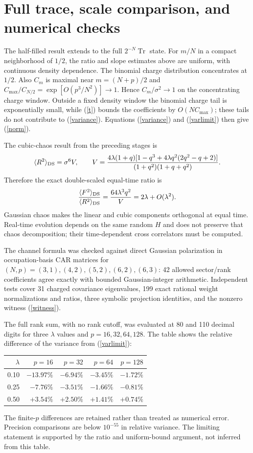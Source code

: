 \documentclass[11pt,a4paper]{article}
\newcommand{\av}[1]{\langle #1\rangle}
\begin{document}
\newpage
\section{Full trace, scale comparison, and numerical checks}
The half-filled result extends to the full
$2^{-N}\operatorname{Tr}$ state. For $m/N$ in a compact
neighborhood of $1/2$, the ratio and slope estimates above are
uniform, with continuous density dependence.
The binomial charge distribution concentrates at $1/2$.
Also $C_m$ is maximal near $m=(N+p)/2$ and
$C_{\max}/C_{N/2}=\exp[O(p^3/N^2)]\to1$.
Hence $C_m/\sigma^2\to1$ on the concentrating charge window.
Outside a fixed density window the binomial charge tail is
exponentially small, while (\ref{t}) bounds the coefficients
by $O(N C_{\max})$; these tails do not contribute to
(\ref{variance}). Equations (\ref{variance}) and (\ref{varlimit})
then give (\ref{norm}).

The cubic-chaos result from the preceding stages is
\[
 \av{R^2}_{\rm DS}=\sigma^6V,\qquad
 V=\frac{4\lambda(1+q)[1-q^3+4\lambda q^2(2q^2-q+2)]}
 {(1+q^2)(1+q+q^2)}.
\]
Therefore the exact double-scaled equal-time ratio is
\begin{equation}
 \frac{\av{F^2}_{\rm DS}}{\av{R^2}_{\rm DS}}
 =\frac{64\lambda^3q^2}{V}=2\lambda+O(\lambda^2).
\end{equation}
Gaussian chaos makes the linear and cubic components orthogonal
at equal time. Real-time evolution depends on the same random
$H$ and does not preserve that chaos decomposition; their
time-dependent cross correlators must be computed.

The channel formula was checked against direct Gaussian
polarization in occupation-basis CAR matrices for
$(N,p)=(3,1),(4,2),(5,2),(6,2),(6,3)$: 42 allowed sector/rank
coefficients agree exactly with bounded Gaussian-integer
arithmetic. Independent tests cover 31 charged covariance
eigenvalues, 199 exact rational weight normalizations and ratios,
three symbolic projection identities, and the nonzero witness
(\ref{witness}).

The full rank sum, with no rank cutoff, was evaluated at 80 and
110 decimal digits for three $\lambda$ values and
$p=16,32,64,128$. The table shows the relative difference
of the variance from (\ref{varlimit}):
\begin{center}
\begin{tabular}{rrrrr}
\toprule
$\lambda$ & $p=16$ & $p=32$ & $p=64$ & $p=128$\\
\midrule
0.10 & $-13.97\%$ & $-6.94\%$ & $-3.45\%$ & $-1.72\%$\\
0.25 & $-7.76\%$ & $-3.51\%$ & $-1.66\%$ & $-0.81\%$\\
0.50 & $+3.54\%$ & $+2.50\%$ & $+1.41\%$ & $+0.74\%$\\
\bottomrule
\end{tabular}
\end{center}
The finite-$p$ differences are retained rather than treated as
numerical error. Precision comparisons are below $10^{-55}$ in
relative variance. The limiting statement is supported by the
ratio and uniform-bound argument, not inferred from this table.
\end{document}

